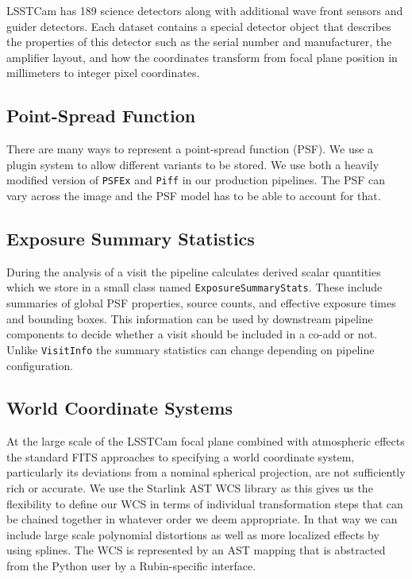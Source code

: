 LSSTCam has 189 science detectors along with additional wave front sensors and guider detectors.
Each dataset contains a special detector object that describes the properties of this detector such as the serial number and manufacturer, the amplifier layout, and how the coordinates transform from focal plane position in millimeters to integer pixel coordinates.

\subsection{Point-Spread Function}

There are many ways to represent a point-spread function (PSF).
We use a plugin system to allow different variants to be stored.
We use both a heavily modified version of \texttt{PSFEx} \cite{2011ASPC..442..435B,2013ascl.soft01001B} and \texttt{Piff} \cite{2021ascl.soft02024J,2021MNRAS.501.1282J} in our production pipelines.
The PSF can vary across the image and the PSF model has to be able to account for that.

\subsection{Exposure Summary Statistics}

During the analysis of a visit the pipeline calculates derived scalar quantities which we store in a small class named \texttt{ExposureSummaryStats}.
These include summaries of global PSF properties, source counts, and effective exposure times and bounding boxes.
This information can be used by downstream pipeline components to decide whether a visit should be included in a co-add or not.
Unlike \texttt{VisitInfo} the summary statistics can change depending on pipeline configuration.

\subsection{World Coordinate Systems}

At the large scale of the LSSTCam focal plane combined with atmospheric effects the standard FITS approaches to specifying a world coordinate system, particularly its deviations from a nominal spherical projection, are not sufficiently rich or accurate.
We use the Starlink AST WCS library \cite{2016A&C....15...33B} as this gives us the flexibility to define our WCS in terms of individual transformation steps that can be chained together in whatever order we deem appropriate.
In that way we can include large scale polynomial distortions as well as more localized effects by using splines.
The WCS is represented by an AST mapping that is abstracted from the Python user by a Rubin-specific interface.

